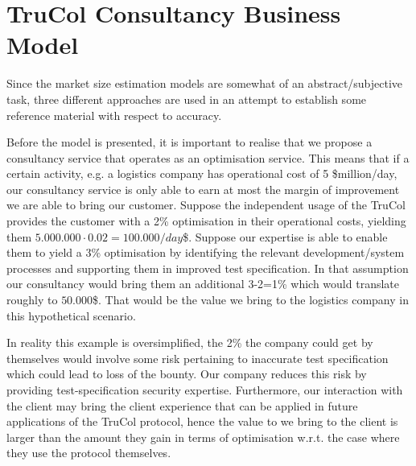 \section{TruCol Consultancy Business Model}\label{sec:trucol_consultancy_business_model}
Since the market size estimation models are somewhat of an abstract/subjective task, three different approaches are used in an attempt to establish some reference material with respect to accuracy.



Before the model is presented, it is important to realise that we propose a consultancy service that operates as an optimisation service. This means that if a certain activity, e.g. a logistics company has operational cost of 5 \$million/day, our consultancy service is only able to earn at most the margin of improvement we are able to bring our customer. Suppose the independent usage of the TruCol provides the customer with a 2\% optimisation in their operational costs, yielding them $5.000.000\cdot 0.02=100.000/day$\$. Suppose our expertise is able to enable them to yield a 3\% optimisation by identifying the relevant development/system processes and supporting them in improved test specification. In that assumption our consultancy would bring them an additional 3-2=1\% which would translate roughly to $50.000$\$. That would be the value we bring to the logistics company in this hypothetical scenario.

In reality this example is oversimplified, the 2\% the company could get by themselves would involve some risk pertaining to inaccurate test specification which could lead to loss of the bounty. Our company reduces this risk by providing test-specification security expertise. Furthermore, our interaction with the client may bring the client experience that can be applied in future applications of the TruCol protocol, hence the value to we bring to the client is larger than the amount they gain in terms of optimisation w.r.t. the case where they use the protocol themselves.